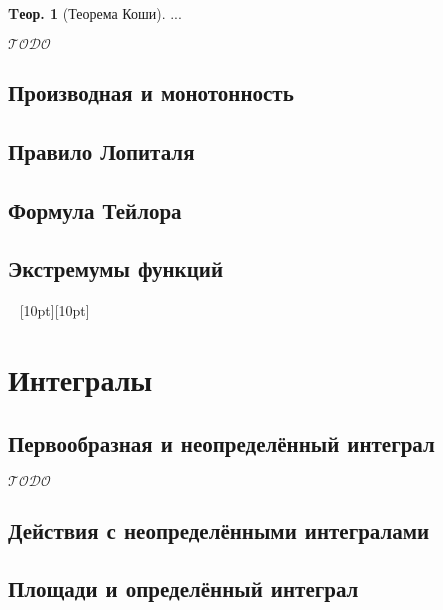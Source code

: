 \documentclass[a4paper,12pt]{article}
\numberwithin{figure}{section}
\theoremstyle{definition}
\theoremstyle{definition}
\newtheorem{theorem}{Tеор.}[section]
\def\todo{\guillemotleft$\mathcal{TODO}$\guillemotright\textellipsis}
\def\vignette{\vspace{48pt} \noindent \hrulefill~ \raisebox{-8pt}[10pt][10pt]{\Huge\ding{102}}~ \hrulefill}
\begin{document}
\begin{theorem}[Теорема Коши]
	...
\end{theorem}

\todo


\subsection{Производная и монотонность}


\subsection{Правило Лопиталя}


\subsection{Формула Тейлора}


\subsection{Экстремумы функций}




\vignette
\section{Интегралы}


\subsection{Первообразная и неопределённый интеграл}

\todo


\subsection{Действия с неопределёнными интегралами}


\subsection{Площади и определённый интеграл}
\end{document}
